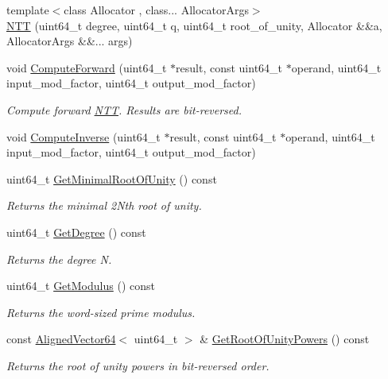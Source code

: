 \begin{DoxyCompactItemize}
{\footnotesize template$<$class Allocator , class... Allocator\+Args$>$ }\\\hyperlink{classintel_1_1hexl_1_1NTT_a831df901cf9ea5a83e5d628cdbd36671}{N\+TT} (uint64\+\_\+t degree, uint64\+\_\+t q, uint64\+\_\+t root\+\_\+of\+\_\+unity, Allocator \&\&a, Allocator\+Args \&\&... args)
\item 
void \hyperlink{classintel_1_1hexl_1_1NTT_a7f8dac5ff3fc117d3e7259762a716140}{Compute\+Forward} (uint64\+\_\+t $\ast$result, const uint64\+\_\+t $\ast$operand, uint64\+\_\+t input\+\_\+mod\+\_\+factor, uint64\+\_\+t output\+\_\+mod\+\_\+factor)
\begin{DoxyCompactList}\small\item\em Compute forward \hyperlink{classintel_1_1hexl_1_1NTT}{N\+TT}. Results are bit-\/reversed. \end{DoxyCompactList}\item 
void \hyperlink{classintel_1_1hexl_1_1NTT_a31e78375dcafd5df85cb1259a9156a9a}{Compute\+Inverse} (uint64\+\_\+t $\ast$result, const uint64\+\_\+t $\ast$operand, uint64\+\_\+t input\+\_\+mod\+\_\+factor, uint64\+\_\+t output\+\_\+mod\+\_\+factor)
\item 
uint64\+\_\+t \hyperlink{classintel_1_1hexl_1_1NTT_af10476eb10c3b5723052bdf59d7f3d22}{Get\+Minimal\+Root\+Of\+Unity} () const
\begin{DoxyCompactList}\small\item\em Returns the minimal 2N\textquotesingle{}th root of unity. \end{DoxyCompactList}\item 
uint64\+\_\+t \hyperlink{classintel_1_1hexl_1_1NTT_a25172ec87ce3cbfe9bbc20cd9c52f2ab}{Get\+Degree} () const
\begin{DoxyCompactList}\small\item\em Returns the degree N. \end{DoxyCompactList}\item 
uint64\+\_\+t \hyperlink{classintel_1_1hexl_1_1NTT_aef2a5afbd559f7e27d5fa7d4e28bd252}{Get\+Modulus} () const
\begin{DoxyCompactList}\small\item\em Returns the word-\/sized prime modulus. \end{DoxyCompactList}\item 
const \hyperlink{namespaceintel_1_1hexl_afbdf0d2cc4209ee547a88ff22a02801b}{Aligned\+Vector64}$<$ uint64\+\_\+t $>$ \& \hyperlink{classintel_1_1hexl_1_1NTT_a71749beadc3fde1d2b80f2d99b739099}{Get\+Root\+Of\+Unity\+Powers} () const
\begin{DoxyCompactList}\small\item\em Returns the root of unity powers in bit-\/reversed order. \end{DoxyCompactList}\item 

\end{DoxyCompactItemize}
